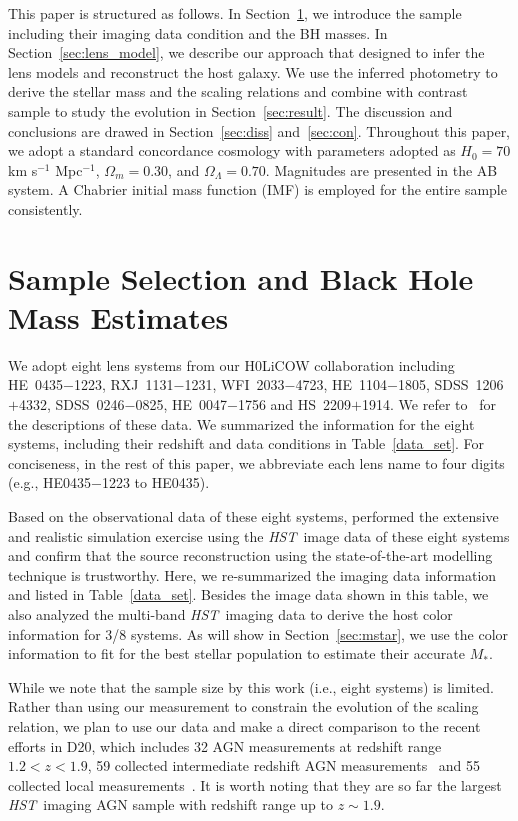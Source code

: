 \documentclass[fleqn,usenatbib]{mnras}
\newcommand{\hst}{{\it HST}}
\newcommand{\mstar}{{$M_*$}}
\begin{document}
This paper is structured as follows. In Section~\ref{sec:sample_select}, we introduce the sample including their imaging data condition and the BH masses. In Section~\ref{sec:lens_model}, we describe our approach that designed to infer the lens models and reconstruct the host galaxy. We use the inferred photometry to derive the stellar mass and the scaling relations and combine with contrast sample to study the evolution in Section~\ref{sec:result}. The discussion and conclusions are drawed in Section~\ref{sec:diss} and~\ref{sec:con}. Throughout this paper, we adopt a standard concordance cosmology with parameters adopted as $H_0= 70$ km s$^{-1}$ Mpc$^{-1}$, $\Omega{_m} = 0.30$, and $\Omega{_\Lambda} = 0.70$. Magnitudes are presented in the AB system. A Chabrier initial mass function (IMF) is employed for the entire sample consistently.

\section{Sample Selection and Black Hole Mass Estimates}\label{sec:sample_select}
We adopt eight lens systems from our H0LiCOW collaboration including HE~0435$-$1223, RXJ~1131$-$1231, WFI~2033$-$4723, HE~1104$-$1805, SDSS~1206$+$4332, SDSS~0246$-$0825, HE~0047$-$1756 and HS~2209$+$1914. We refer to~\citet{Suyu2017, Ding2017a} for the descriptions of these data. We summarized the information for the eight systems, including their redshift and data conditions in Table~\ref{data_set}.
For conciseness, in the rest of this paper, we abbreviate each lens name to four digits (e.g., HE0435$-$1223 to HE0435). 

Based on the observational data of these eight systems, \citet{Ding2017a} performed the extensive and realistic simulation exercise using the \hst\ image data of these eight systems and confirm that the source reconstruction using the state-of-the-art modelling technique is trustworthy. %
Here, we re-summarized the imaging data information and listed in Table~\ref{data_set}. Besides the image data shown in this table, we also analyzed the multi-band \hst\ imaging data to derive the host color information for 3/8 systems. As will show in Section~\ref{sec:mstar}, we use the color information to fit for the best stellar population to estimate their accurate \mstar. 

While we note that the sample size by this work (i.e., eight systems) is limited. Rather than using our measurement to constrain the evolution of the scaling relation, we plan to use our data and make a direct comparison to the recent efforts in D20, which includes 32 AGN measurements at redshift range $1.2<z<1.9$, 59 collected intermediate redshift AGN measurements~\citep{Bennert11, SS13, Cisternas2011} and 55 collected local measurements~\citep{Bennert++2011, H+R04}. It is worth noting that they are so far the largest \hst\ imaging AGN sample with redshift range up to $z\sim1.9$. 
 
\end{document}
